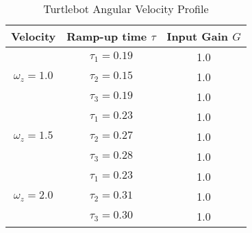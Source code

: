 \documentclass[14pt,letterpaper]{article}
\begin{document}
\begin{table}[H]
\centering
\caption{Turtlebot Angular Velocity Profile}
\begin{tabular}{ccc}
\toprule
\textbf{Velocity} & \textbf{Ramp-up time $\tau$} & \textbf{Input Gain $G$} \\
\midrule
\midrule
\multirow{3}{*}{$\omega_z = 1.0$} & $\tau_1= 0.19$ & 1.0 \\
                                  & $\tau_2= 0.15$ & 1.0 \\
                                  & $\tau_3= 0.19$ & 1.0 \\
\midrule
\multirow{3}{*}{$\omega_z = 1.5$} & $\tau_1= 0.23$ & 1.0 \\
                                  & $\tau_2= 0.27$ & 1.0 \\
                                  & $\tau_3= 0.28$ & 1.0 \\
\midrule
\multirow{3}{*}{$\omega_z = 2.0$} & $\tau_1= 0.23$ & 1.0 \\
                                  & $\tau_2= 0.31$ & 1.0 \\
                                  & $\tau_3= 0.30$ & 1.0 \\
\bottomrule
\end{tabular}
\end{table}
\end{document}
